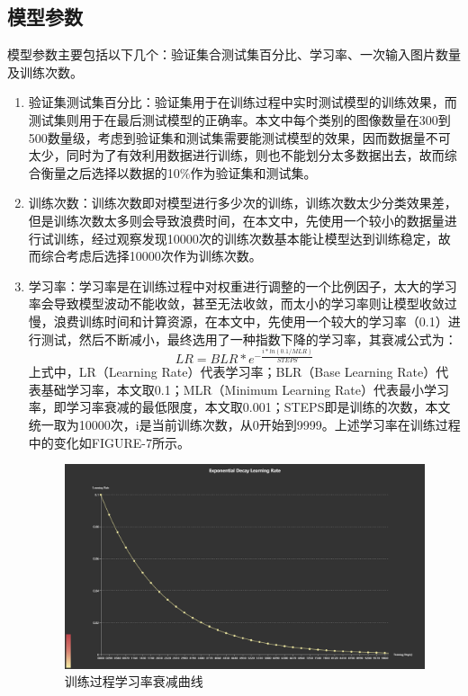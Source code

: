 \documentclass{ctexart}
\begin{document}
\subsection{模型参数}
模型参数主要包括以下几个：验证集合测试集百分比、学习率、一次输入图片数量及训练次数。
\begin{enumerate}
\item 验证集测试集百分比：验证集用于在训练过程中实时测试模型的训练效果，而测试集则用于在最后测试模型的正确率。本文中每个类别的图像数量在300到500数量级，考虑到验证集和测试集需要能测试模型的效果，因而数据量不可太少，同时为了有效利用数据进行训练，则也不能划分太多数据出去，故而综合衡量之后选择以数据的10\%作为验证集和测试集。
\item 训练次数：训练次数即对模型进行多少次的训练，训练次数太少分类效果差，但是训练次数太多则会导致浪费时间，在本文中，先使用一个较小的数据量进行试训练，经过观察发现10000次的训练次数基本能让模型达到训练稳定，故而综合考虑后选择10000次作为训练次数。
\item 学习率：学习率是在训练过程中对权重进行调整的一个比例因子，太大的学习率会导致模型波动不能收敛，甚至无法收敛，而太小的学习率则让模型收敛过慢，浪费训练时间和计算资源，在本文中，先使用一个较大的学习率（0.1）进行测试，然后不断减小，最终选用了一种指数下降的学习率，其衰减公式为：
\begin{equation}
LR=BLR*e^{-\frac{i*ln(0.1/MLR)}{STEPS}}
\end{equation}
上式中，LR（Learning Rate）代表学习率；BLR（Base Learning Rate）代表基础学习率，本文取0.1；MLR（Minimum Learning Rate）代表最小学习率，即学习率衰减的最低限度，本文取0.001；STEPS即是训练的次数，本文统一取为10000次，i是当前训练次数，从0开始到9999。上述学习率在训练过程中的变化如FIGURE-7所示。
\begin{figure}[!htbp] 
\centering
\includegraphics[width=\linewidth]{img/lr2.png} 
\caption{训练过程学习率衰减曲线}
\label{f7} 
\end{figure}
\end{enumerate}
\end{document}
